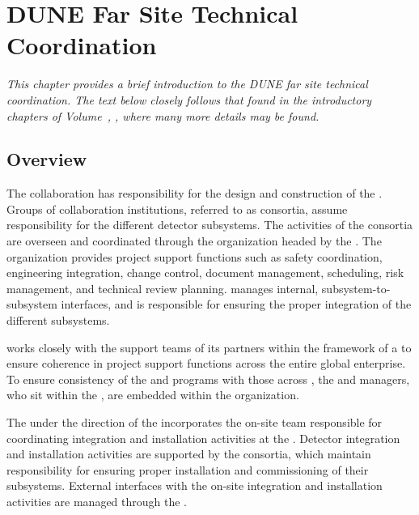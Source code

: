 \chapter{DUNE Far Site Technical Coordination}
\label{ch:exec-tc}

\textit{This chapter provides a brief introduction to the DUNE far site technical coordination.  The text below closely follows that found in the introductory chapters of Volume~\volnumbertc{}, \voltitletc{}, where many more details may be found.}

\section{Overview}   %


The  collaboration has  responsibility for the design 
and construction of the  .  Groups of collaboration 
institutions, referred to as consortia, assume responsibility for 
the different detector subsystems.  The activities of the consortia are 
overseen and coordinated through the   organization 
headed by the  .  The  organization 
provides project support functions such as safety coordination, 
engineering integration, change control, document management, scheduling, 
risk management, and technical review planning.    
manages internal, subsystem-to-subsystem interfaces, and is responsible 
for ensuring the proper integration of the different subsystems.   


  works closely with the support teams of its 
 partners within the framework of a  to 
ensure coherence in project support functions across the entire global 
enterprise.  To ensure consistency of the   
and  programs with those across , the 
  and  managers, who sit within 
the , are embedded within the   
organization.  

The   under the 
direction of the  incorporates the on-site team responsible 
for coordinating integration and installation activities at the .
Detector integration and installation activities are supported by the
 consortia, which maintain responsibility for ensuring
proper installation and commissioning of their subsystems.  External
 interfaces with the on-site integration and installation
activities are managed through the . 


